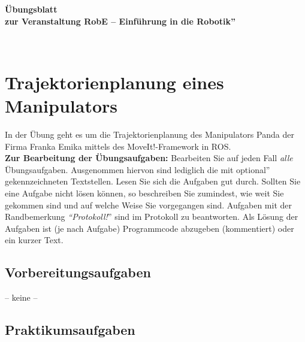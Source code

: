 \documentclass[ti,nofooter]{own-haw-page}
\begin{document}
\date{10.~Dezember~2021}


\setcounter{section}{5}
\setcounter{dummymcpdsv}{\value{section}}
\addtocounter{dummymcpdsv}{1}


\begin{page}

\begin{Large}
{\centering \bfseries \"{U}bungsblatt \\ zur Veranstaltung  
\glqq RobE -- Einf\"{u}hrung in die Robotik''\\}
\end{Large}
~\\[-0.5cm]


\section{Trajektorienplanung eines Manipulators}

In der \"{U}bung  geht es um die Trajektorienplanung des Manipulators Panda der Firma Franka Emika mittels des MoveIt!-Framework in ROS. \\


\textbf{Zur Bearbeitung der \"{U}bungsaufgaben:} Bearbeiten Sie auf jeden Fall
\textit{alle} \"{U}bungsaufgaben. Ausgenommen hiervon sind lediglich die mit \glqq
optional'' gekennzeichneten Textstellen. Lesen Sie sich die Aufgaben gut durch.
Sollten Sie eine Aufgabe nicht l\"{o}sen k\"{o}nnen, so beschreiben Sie
zumindest, wie weit Sie gekommen sind und auf welche Weise Sie vorgegangen sind.
%
Aufgaben mit der Randbemerkung \textit{``Protokoll!}'' sind 
im Protokoll zu beantworten.
Als L\"{o}sung der Aufgaben ist %
(je nach Aufgabe)
Programmcode abzugeben
(kommentiert) oder ein kurzer Text.


\subsection{Vorbereitungsaufgaben}


-- keine --

\subsection{Praktikumsaufgaben}


\end{page}
\end{document}
